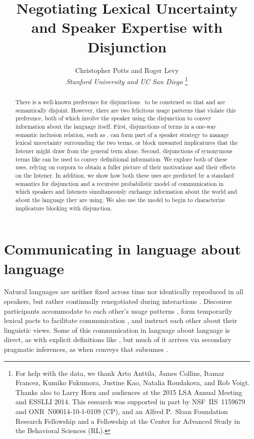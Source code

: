 \documentclass[12pt,twoside]{article}
\title{Negotiating Lexical Uncertainty and Speaker Expertise with Disjunction}				%
\author{\sc Christopher Potts and Roger Levy\\ 						%
{\it Stanford University and UC San Diego}%
\footnote{For help with the data, we thank Arto Anttila, James Collins, Itamar Francez, Kumiko Fukumora, Justine Kao, Natalia Roudakova, and Rob Voigt. 
Thanks also to Larry Horn and audiences at the 2015 LSA Annual Meeting and ESSLLI 2014. 
This research was supported in part by NSF~IIS~1159679 and ONR~N00014-10-1-0109 (CP), 
and an Alfred P.~Sloan Foundation Research Fellowship and a Fellowship at the Center for Advanced Study in the Behavioral Sciences (RL).}} %
\date{}
\renewcommand{\_}{\textbf{\textunderscore\hspace{-4pt}\textunderscore\hspace{-3pt}\textunderscore\hspace{-4pt}\textunderscore}\hspace{0.5pt}}			%
\begin{document}
\maketitle
\thispagestyle{empty}	

\newcommand{\XorY}{\word{X\,or\,Y}}
\newcommand{\AorX}{\word{A\,or\,X}}

\begin{abstract}
  There is a well-known preference for disjunctions \XorY\ to be
  construed so that  and  are semantically disjoint.
  However, there are two felicitous usage patterns that violate this
  preference, both of which involve the speaker using the disjunction
  to convey information about the language itself.  First,
  disjunctions of terms in a one-way semantic inclusion relation, such
  as , can form part of a speaker strategy to
  manage lexical uncertainty surrounding the two terms, or block
  unwanted implicatures that the listener might draw from the general
  term alone. Second, disjunctions of synonymous terms like  can be used to convey definitional
  information. We explore both of these uses, relying on corpora to
  obtain a fuller picture of their motivations and their effects on
  the listener. In addition, we show how both these uses are predicted
  by a standard semantics for disjunction and a recursive
  probabilistic model of communication in which speakers and listeners
  simultaneously exchange information about the world and about the
  language they are using.  We also use the model to begin to
  characterize implicature blocking with disjunction.
\end{abstract}
			


\section{Communicating in language about language}\label{sec:introduction}

Natural languages are neither fixed across time nor identically
reproduced in all speakers, but rather continually renegotiated during
interactions \citep{Clark97}. Discourse participants accommodate to
each other's usage patterns \citep{Giles:Coupland:Coupland:1991}, form
temporarily lexical pacts to facilitate communication
\citep{Clark:Wilkes-Gibbs:1986,Brennan:Clark:1996}, and instruct each
other about their linguistic views. Some of this communication in
language about language is direct, as with explicit definitions like
, but much of it arrives via
secondary pragmatic inferences, as when  conveys
that  subsumes  \citep{Hearst92,SnowEtAl05}.
\end{document}
